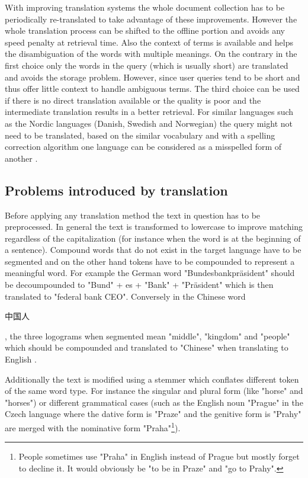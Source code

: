 \documentclass[journal]{IEEEtran}
\begin{document}
With improving translation systems the whole document collection has to be periodically re-translated to take advantage of these improvements.
However the whole translation process can be shifted to the offline portion and avoids any speed penalty at retrieval time.
Also the context of terms is available and helps the disambiguation of the words with multiple meanings.
On the contrary in the first choice only the words in the query (which is usually short) are translated and avoids the storage problem.
However, since user queries tend to be short and thus offer little context to handle ambiguous terms.
The third choice can be used if there is no direct translation available or the quality is poor and the intermediate translation results in a better retrieval.
For similar languages such as the Nordic languages (Danish, Swedish and Norwegian) the query might not need to be translated, based on the similar vocabulary and with a spelling correction algorithm one language can be considered as a misspelled form of another \cite{peters12}.

\subsection{Problems introduced by translation}
\label{sec:problems}
Before applying any translation method the text in question has to be preprocessed.
In general the text is transformed to lowercase to improve matching regardless of the capitalization (for instance when the word is at the beginning of a sentence).
Compound words that do not exist in the target language have to be segmented and on the other hand tokens have to be compounded to represent a meaningful word.
For example the German word "Bundesbankpr\"{a}sident" should be decoumpounded to "Bund" + es + "Bank" + "Pr\"{a}sident" which is then translated to "federal bank CEO".
Conversely in the Chinese word \begin{CJK}{UTF8}{gbsn}中国人\end{CJK}, the three logograms when segmented mean "middle", "kingdom" and "people" which should be compounded and translated to "Chinese" when translating to English \cite{ir13}.

Additionally the text is modified using a stemmer which conflates different token of the same word type.
For instance the singular and plural form (like "horse" and "horses") or different grammatical cases (such as the English noun "Prague" in the Czech language where the dative form is "Praze" and the genitive form is "Prahy" are merged with the nominative form "Praha"\footnote{People sometimes use "Praha" in English instead of Prague but mostly forget to decline it.
It would obviously be "to be in Praze" and "go to Prahy".}).
\end{document}
